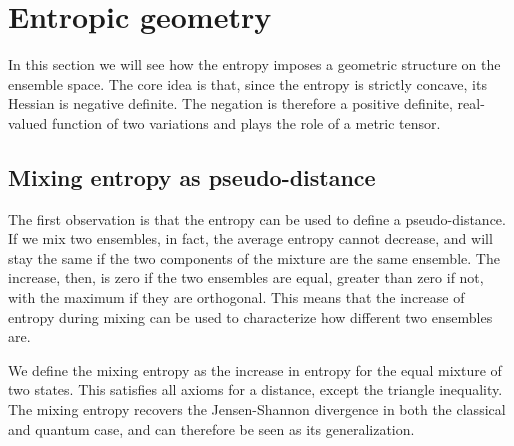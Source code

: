 


\section{Entropic geometry}

In this section we will see how the entropy imposes a geometric structure on the ensemble space. The core idea is that, since the entropy is strictly concave, its Hessian is negative definite. The negation is therefore a positive definite, real-valued function of two variations and plays the role of a metric tensor.

\subsection{Mixing entropy as pseudo-distance}

The first observation is that the entropy can be used to define a pseudo-distance. If we mix two ensembles, in fact, the average entropy cannot decrease, and will stay the same if the two components of the mixture are the same ensemble. The increase, then, is zero if the two ensembles are equal, greater than zero if not, with the maximum if they are orthogonal. This means that the increase of entropy during mixing can be used to characterize how different two ensembles are.

We define the mixing entropy as the increase in entropy for the equal mixture of two states. This satisfies all axioms for a distance, except the triangle inequality. The mixing entropy recovers the Jensen-Shannon divergence in both the classical and quantum case, and can therefore be seen as its generalization.

